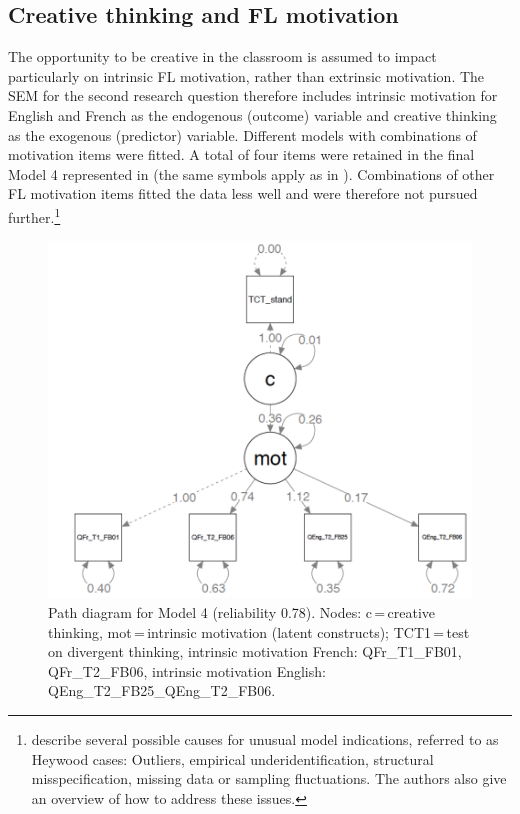 \documentclass[output=paper]{langsci/langscibook}
\begin{document}
\subsection{Creative thinking and FL motivation}

The opportunity to be creative in the classroom is assumed to impact particularly on intrinsic FL motivation, rather than extrinsic motivation. The SEM for the second research question therefore includes intrinsic motivation for English and French as the endogenous (outcome) variable and creative thinking as the exogenous (predictor) variable. Different models with combinations of motivation items were fitted. A total of four items were retained in the final Model 4 represented in  (the same symbols apply as in ). Combinations of other FL motivation items fitted the data less well and were therefore not pursued further.\footnote{\citet{KolenikovBollen2016} describe several possible causes for unusual model indications, referred to as Heywood cases: Outliers, empirical underidentification, structural misspecification, missing data or sampling fluctuations. The authors also give an overview of how to address these issues.} 

  
\begin{figure}
\includegraphics[width=\textwidth]{figures/Figure6.2.png}
\caption{\label{fig:06:2}Path diagram for Model 4 (reliability 0.78). Nodes: c\,=\,creative thinking, mot\,=\,intrinsic motivation (latent constructs); TCT1\,=\,test on divergent thinking, intrinsic motivation French: \mbox{QFr\_T1\_FB01}, \mbox{QFr\_T2\_FB06}, intrinsic motivation English: \mbox{QEng\_T2\_FB25\_QEng\_T2\_FB06}.}
\end{figure}
\end{document}
